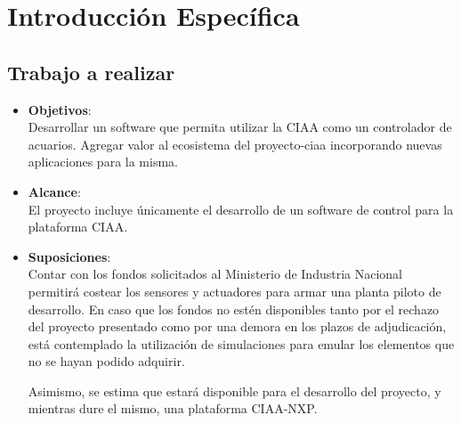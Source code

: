 
\chapter{Introducción Específica} %

\label{Chapter2} %


\section{Trabajo a realizar}


\begin{itemize}

	\item \textbf{Objetivos}:\\
	Desarrollar un software que permita utilizar la CIAA como un controlador de acuarios. Agregar valor al ecosistema del proyecto-ciaa incorporando nuevas aplicaciones para la misma.
	
	\item \textbf{Alcance}:\\
	El proyecto incluye únicamente el desarrollo de un software de control para la plataforma CIAA.


	\item \textbf{Suposiciones}:\\
	Contar con los fondos solicitados al Ministerio de Industria Nacional permitirá costear los sensores y actuadores para armar una planta piloto de desarrollo.  En caso que los fondos no estén disponibles tanto por el rechazo del proyecto presentado como por una demora en los plazos de adjudicación, está contemplado la utilización de simulaciones para emular los elementos que no se hayan podido adquirir.
	
	Asimismo, se estima que estará disponible para el desarrollo del proyecto, y mientras dure el mismo, una plataforma CIAA-NXP.
	
	\end{itemize}

